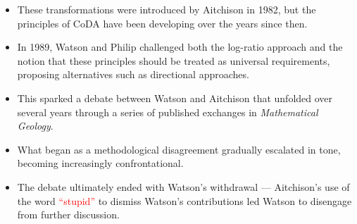         
 
 
 


\begin{frame}
\begin{itemize}
    \item[\textcolor{blue}{\large$\blacktriangleright$}] These transformations were introduced by Aitchison in 1982, but the principles of CoDA have been developing over the years since then.
    \item[\textcolor{blue}{\large$\blacktriangleright$}] In 1989, Watson and Philip challenged both the log-ratio approach and the notion that these principles should be treated as universal requirements, proposing alternatives such as directional approaches.
    \item[\textcolor{blue}{\large$\blacktriangleright$}] This sparked a debate between Watson and Aitchison that unfolded over several years through a series of published exchanges in \textit{Mathematical Geology}.
    \item[\textcolor{blue}{\large$\blacktriangleright$}] What began as a methodological disagreement gradually escalated in tone, becoming increasingly confrontational.
    \item[\textcolor{blue}{\large$\blacktriangleright$}] The debate ultimately ended with Watson's withdrawal --- Aitchison's use of the word \textcolor{red}{``stupid''} to dismiss Watson's contributions led Watson to disengage from further discussion.
\end{itemize}
\end{frame}

